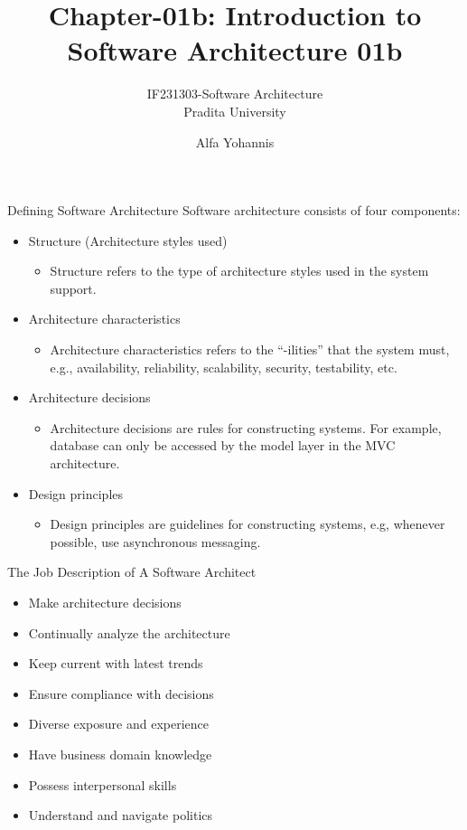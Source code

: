 \documentclass{beamer}
\title{Chapter-01b: Introduction to Software Architecture 01b}
\subtitle{IF231303-Software Architecture\\Pradita University}
\author{Alfa Yohannis}
\begin{document}
	
	\begin{frame}[plain]
	    \maketitle
	\end{frame}
	
	\begin{frame}{Defining Software Architecture}
	Software architecture consists of four components:
	\begin{itemize}
	
	\item Structure (Architecture styles used)
	\begin{itemize}
	\item Structure refers to the type of architecture styles used in the system support.
	\end{itemize}
	
	\item Architecture characteristics 
	\begin{itemize}
	\item Architecture characteristics refers to the ``-ilities'' that the system must, e.g., availability, reliability, scalability, security, testability, etc. 
	\end{itemize}
	
	\item Architecture decisions
	\begin{itemize}
	\item Architecture decisions are rules for constructing systems. For example, database can only be accessed by the model layer in the MVC architecture.
	\end{itemize}
	
	\item Design principles
	\begin{itemize}
	\item Design principles are guidelines for constructing systems, e.g, whenever possible, use asynchronous messaging.
	\end{itemize}
	
	\end{itemize}
	\end{frame}
	
	\begin{frame}{The Job Description of A Software Architect}
	\begin{itemize}
	\item Make architecture decisions
	\item Continually analyze the architecture
	\item Keep current with latest trends
	\item Ensure compliance with decisions
	\item Diverse exposure and experience
	\item Have business domain knowledge
	\item Possess interpersonal skills
	\item Understand and navigate politics
	\end{itemize}
	\end{frame}
	
\end{document}
